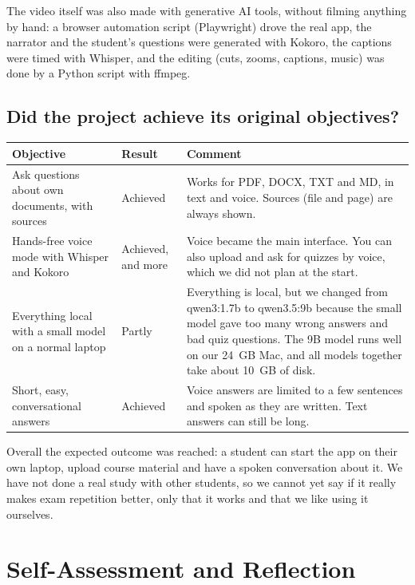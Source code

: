 \documentclass[11pt,a4paper]{article}
\begin{document}
The video itself was also made with generative AI tools, without filming
anything by hand: a browser automation script (Playwright) drove the real app,
the narrator and the student's questions were generated with Kokoro, the
captions were timed with Whisper, and the editing (cuts, zooms, captions,
music) was done by a Python script with ffmpeg.

\subsection*{Did the project achieve its original objectives?}

\begin{tabularx}{\textwidth}{@{}p{4.4cm}p{2.2cm}X@{}}
  \toprule
  \textbf{Objective} & \textbf{Result} & \textbf{Comment} \\
  \midrule
  Ask questions about own documents, with sources
    & Achieved
    & Works for PDF, DOCX, TXT and MD, in text and voice. Sources (file and
      page) are always shown. \\
  Hands-free voice mode with Whisper and Kokoro
    & Achieved, and more
    & Voice became the main interface. You can also upload and ask for quizzes
      by voice, which we did not plan at the start. \\
  Everything local with a small model on a normal laptop
    & Partly
    & Everything is local, but we changed from qwen3:1.7b to qwen3.5:9b because
      the small model gave too many wrong answers and bad quiz questions. The
      9B model runs well on our 24~GB Mac, and all models together take about
      10~GB of disk. \\
  Short, easy, conversational answers
    & Achieved
    & Voice answers are limited to a few sentences and spoken as they are
      written. Text answers can still be long. \\
  \bottomrule
\end{tabularx}

Overall the expected outcome was reached: a student can start the app on their
own laptop, upload course material and have a spoken conversation about it. We
have not done a real study with other students, so we cannot yet say if it
really makes exam repetition better, only that it works and that we like using
it ourselves.

\section{Self-Assessment and Reflection}
\end{document}
